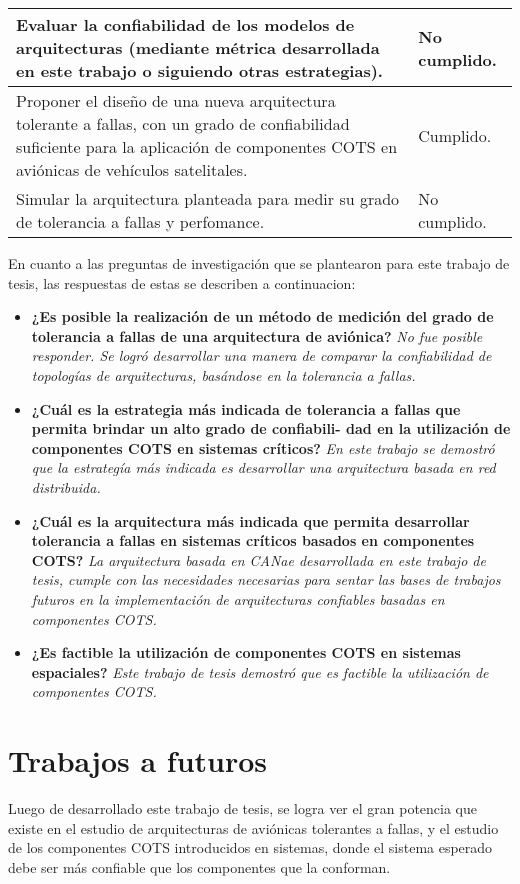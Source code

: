 \begin{table}[h!]
\begin{tabular}{|p{7cm}|p{8cm}|}
Evaluar la confiabilidad de los modelos de arquitecturas (mediante métrica desarrollada en este trabajo o
siguiendo otras estrategias). & No cumplido. \\ \hline
Proponer el diseño de una nueva arquitectura tolerante a fallas, con un grado de confiabilidad suficiente
para la aplicación de componentes COTS en aviónicas de vehículos satelitales. & Cumplido. \\ \hline
Simular la arquitectura planteada para medir su grado de tolerancia a fallas y perfomance. & No cumplido. \\ \hline
\end{tabular}
\end{table}

En cuanto a las preguntas de investigación que se plantearon para este trabajo de tesis, las respuestas de estas
se describen a continuacion:

\begin{itemize}
\item \textbf{¿Es posible la realización de un método de medición del grado de tolerancia a fallas de una arquitectura
de aviónica?} \textit{No fue posible responder. Se logró desarrollar una manera de comparar la confiabilidad de 
topologías de arquitecturas, basándose en la tolerancia a fallas. }
\item \textbf{¿Cuál es la estrategia más indicada de tolerancia a fallas que permita brindar un alto grado de confiabili-
dad en la utilización de componentes COTS en sistemas críticos?} \textit{En este trabajo se demostró
que la estrategía más indicada es desarrollar una arquitectura basada en red distribuida.}
\item \textbf{¿Cuál es la arquitectura más indicada que permita desarrollar tolerancia a fallas en sistemas críticos
basados en componentes COTS?} \textit{La arquitectura basada en CANae desarrollada en este trabajo de tesis,
cumple con las necesidades necesarias para sentar las bases de trabajos futuros en la implementación de
arquitecturas confiables basadas en componentes COTS.}
\item \textbf{¿Es factible la utilización de componentes COTS en sistemas espaciales?} \textit{Este trabajo de tesis
demostró que es factible la utilización de componentes COTS.}
\end{itemize}

\section{Trabajos a futuros}
Luego de desarrollado este trabajo de tesis, se logra ver el gran potencia que existe
en el estudio de arquitecturas de aviónicas tolerantes a fallas, y el estudio
de los componentes COTS introducidos en sistemas, donde el sistema esperado debe ser
más confiable que los componentes que la conforman.

